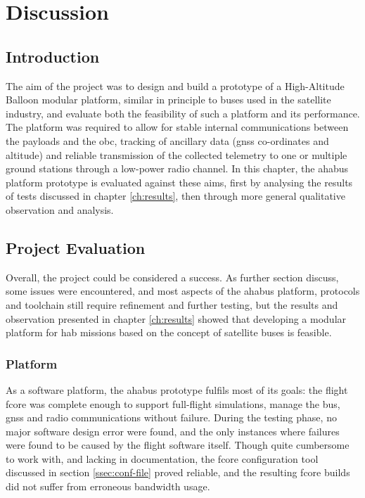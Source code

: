 \chapter{Discussion}
\label{ch:discussion}

\section{Introduction}

The aim of the project was to design and build a prototype of a High-Altitude
Balloon modular platform, similar in principle to buses used in the satellite
industry, and evaluate both the feasibility of such a platform and its
performance. The platform was required to allow for stable internal
communications between the payloads and the \acrlong{obc}, tracking of
ancillary data (\acrshort{gnss} co-ordinates and altitude) and reliable
transmission of the collected telemetry to one or multiple ground stations 
through a low-power radio channel. In this chapter, the \acrshort{ahabus}
platform prototype is evaluated against these aims, first by analysing the
results of tests discussed in chapter \ref{ch:results}, then through more
general qualitative observation and analysis.%

\section{Project Evaluation}

Overall, the project could be considered a success. As further section discuss,
some issues were encountered, and most aspects of the \acrshort{ahabus}
platform, protocols and toolchain still require refinement and further testing,
but the results and observation presented in chapter \ref{ch:results} showed
that developing a modular platform for \acrlong{hab} missions based on the
concept of satellite buses is feasible.

\subsection{Platform}

As a software platform, the \acrshort{ahabus} prototype fulfils most of its
goals: the flight \acrshort{fcore} was complete enough to support full-flight
simulations, manage the bus, \acrshort{gnss} and radio communications without
failure. During the testing phase, no major software design error were found,
and the only instances where failures were found to be caused by the flight
software itself. Though quite cumbersome to work with, and lacking in
documentation, the \acrshort{fcore} configuration tool discussed in section
\ref{ssec:conf-file} proved reliable, and the resulting \acrshort{fcore} builds
did not suffer from erroneous bandwidth usage.

